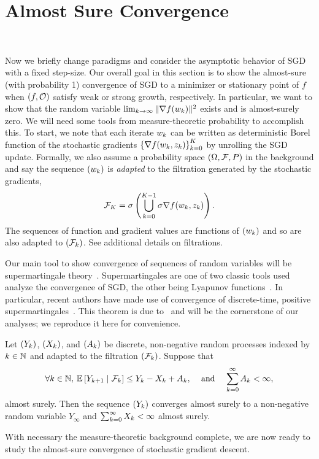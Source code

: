 \section{Almost Sure Convergence}~\label{sec:almost-sure}

Now we briefly change paradigms and consider the asymptotic behavior of \ac{SGD} with a fixed step-size.
Our overall goal in this section is to show the almost-sure (with probability 1) convergence of \ac{SGD} to a minimizer or stationary point of \( f \) when \( \rbr{f, \oracle{}} \) satisfy weak or strong growth, respectively.
In particular, we want to show that the random variable \( \lim_{\iter \rightarrow \infty} \norm{\grad(\wk)}^2 \) exists and is almost-surely zero.
We will need some tools from measure-theoretic probability to accomplish this.
To start, we note that each iterate \( \w_k \) can be written as deterministic Borel function of the stochastic gradients \( \cbr{\grad(\wk, \zk)}_{\iter=0}^{K} \) by unrolling the \ac{SGD} update.
Formally, we also assume a probability space \( \rbr{\Omega,  \calF, P} \) in the background and say the sequence \( \seq{\wk} \) is \emph{adapted} to the filtration generated by the stochastic gradients,
\begin{align*}
    \calF_K = \sigma \rbr{\bigcup_{\iter = 0}^{K-1} \sigma \grad(\wk, \zk)}.
\end{align*}
The sequences of function and gradient values are functions of \( \seq{\wk} \) and so are also adapted to \( \seq{\calF_\iter} \).
See \citet{ccinlar2011probability} additional details on filtrations.

Our main tool to show convergence of sequences of random variables will be supermartingale theory~\citep{ccinlar2011probability}.
Supermartingales are one of two classic tools used analyze the convergence of \ac{SGD}, the other being Lyapunov functions~\citep{bertsekas2000gradient}.
In particular, recent authors have made use of convergence of discrete-time, positive supermartingales~\citep{bertsekas2011incremental, nguyen2018sgd}.
This theorem is due to~\citet{neveu1975discrete} and will be the cornerstone of our analyses; we reproduce it here for convenience.

\begin{theorem}\label{thm:positive_supermartingales}
    Let \( \seq{Y_\iter} \), \( \seq{X_\iter} \), and \( \seq{A_\iter} \) be discrete, non-negative random processes indexed by \( \iter \in \bbN \) and adapted to the filtration \( \seq{\calF_\iter} \).
    Suppose that
    \begin{align*}
        \forall \iter \in \bbN, \: \E \sbr{Y_{\iter+1} \mid \calF_\iter} \leq Y_\iter - X_\iter + A_\iter,
        && \text{ and } &&
        \sum_{k=0}^{\infty} A_\iter < \infty,
    \end{align*}
    almost surely.
    Then the sequence \( \seq{Y_\iter} \) converges almost surely to a non-negative random variable \( Y_\infty \) and \( \sum_{k=0}^{\infty} X_\iter < \infty \) almost surely.
\end{theorem}
With necessary the measure-theoretic background complete, we are now ready to study the almost-sure convergence of stochastic gradient descent.

